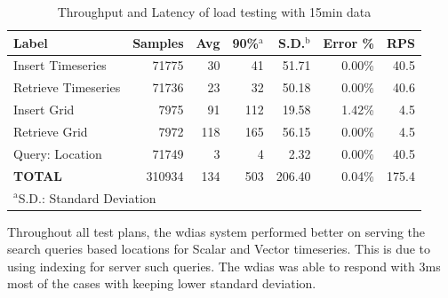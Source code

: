 \documentclass[conference]{IEEEtran}
\begin{document}
\begin{table}[tb!]
\caption{ Throughput and Latency of load testing with 15min data}
\begin{center}
\begin{adjustbox}{width=0.45\textwidth}
\begin{tabular}{|l|r|r|r|r|r|r|}
\hline
\textbf{Label} & \textbf{Samples} & \textbf{Avg} & \textbf{90\%$^{\mathrm{a}}$} & \textbf{S.D.$^{\mathrm{b}}$} & \textbf{Error \%} & \textbf{RPS} \\ \hline
Insert Timeseries & 71775 & 30 & 41 & 51.71 & 0.00\% & 40.5 \\ \hline
Retrieve Timeseries & 71736 & 23 & 32 & 50.18 & 0.00\% & 40.6 \\ \hline
Insert Grid & 7975 & 91 & 112 & 19.58 & 1.42\% & 4.5 \\ \hline
Retrieve Grid & 7972 & 118 & 165 & 56.15 & 0.00\% & 4.5 \\ \hline
Query: Location & 71749 & 3 & 4 & 2.32 & 0.00\% & 40.5 \\ \hline
\textbf{TOTAL} & 310934 & 134 & 503 & 206.40 & 0.04\% & 175.4 \\ \hline
\multicolumn{4}{l}{$^{\mathrm{a}}$S.D.: Standard Deviation}{$^{\mathrm{b}}$90\%: 90\% percentile}
\end{tabular}
\end{adjustbox}
\label{ptab:obs_all_15_min_summary_throughput}
\end{center}
\end{table}

Throughout all test plans, the \acrshort{wdias} system performed better on serving the search queries based locations for Scalar and Vector timeseries. This is due to using indexing for server such queries. The \acrshort{wdias} was able to respond with 3ms most of the cases with keeping lower standard deviation.
\end{document}
